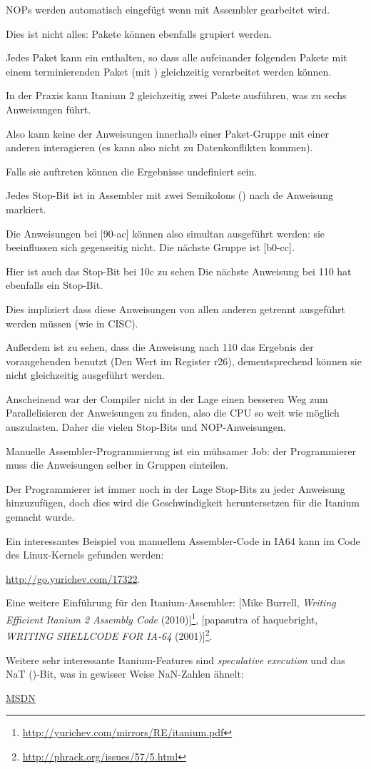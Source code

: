 \ac{NOP}s werden automatisch eingefügt wenn mit Assembler gearbeitet wird.

Dies ist nicht alles: Pakete können ebenfalls grupiert werden.

Jedes Paket kann ein   enthalten, so dass alle aufeinander folgenden
Pakete mit einem terminierenden Paket (mit ) gleichzeitig verarbeitet
werden können.

In der Praxis kann Itanium 2 gleichzeitig zwei Pakete ausführen, was zu sechs
Anweisungen führt.

Also kann keine der Anweisungen innerhalb einer Paket-Gruppe mit einer anderen
interagieren (es kann also nicht zu Datenkonflikten kommen).

Falls sie auftreten können die Ergebnisse undefiniert sein.

Jedes Stop-Bit ist in Assembler mit zwei Semikolons (\TT{;;}) nach de Anweisung markiert.

Die Anweisungen bei [90-ac] können also simultan ausgeführt werden: sie beeinflussen
sich gegenseitig nicht. Die nächste Gruppe ist [b0-cc].

Hier ist auch das Stop-Bit bei 10c zu sehen
Die nächste Anweisung bei 110 hat ebenfalls ein Stop-Bit.

Dies impliziert dass diese Anweisungen von allen anderen getrennt ausgeführt werden
müssen (wie in \ac{CISC}).

Außerdem ist zu sehen, dass die Anweisung nach 110 das Ergebnis der vorangehenden
benutzt (Den Wert im Register r26), dementsprechend können sie nicht gleichzeitig
ausgeführt werden.

Anscheinend war der Compiler nicht in der Lage einen besseren Weg zum Parallelisieren
der Anweisungen zu finden, also die \ac{CPU} so weit wie möglich auszulasten. Daher
die vielen Stop-Bits und \ac{NOP}-Anweisungen.

Manuelle Assembler-Programmierung ist ein mühsamer Job: der Programmierer muss
die Anweisungen selber in Gruppen einteilen.

Der Programmierer ist immer noch in der Lage Stop-Bits zu jeder Anweisung hinzuzufügen,
doch dies wird die Geschwindigkeit heruntersetzen für die Itanium gemacht wurde.

Ein interessantes Beispiel von manuellem Assembler-Code in \ac{IA64} kann im Code
des Linux-Kernels gefunden werden:

\url{http://go.yurichev.com/17322}.

Eine weitere Einführung für den Itanium-Assembler:
[Mike Burrell, \emph{Writing Efficient Itanium 2 Assembly Code} (2010)]\footnote{\AlsoAvailableAs \url{http://yurichev.com/mirrors/RE/itanium.pdf}},
[papasutra of haquebright, \emph{WRITING SHELLCODE FOR IA-64} (2001)]\footnote{\AlsoAvailableAs \url{http://phrack.org/issues/57/5.html}}.

Weitere sehr interessante Itanium-Features sind \emph{speculative execution} und das
NaT ()-Bit, was in gewisser Weise \gls{NaN}-Zahlen ähnelt:

\href{http://go.yurichev.com/17323}{MSDN}
